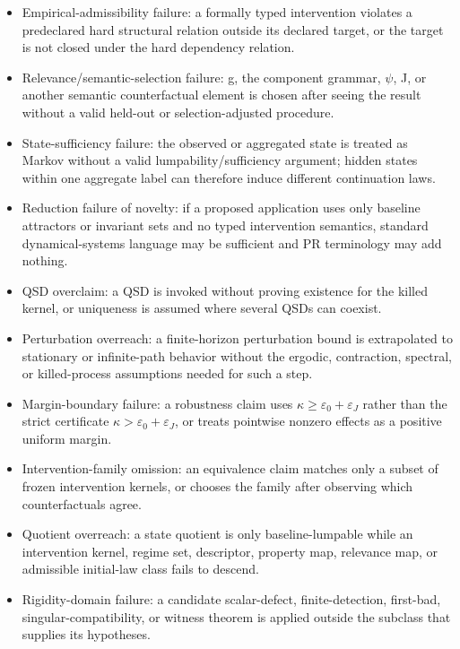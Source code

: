 \documentclass[10pt]{article}
\begin{document}
\begin{itemize}
  unsupported rows or relies on held-fixed causal mechanisms whose
  stability under J lacks adequate identification/provenance.
\item
  Empirical-admissibility failure: a formally typed intervention
  violates a predeclared hard structural relation outside its declared
  target, or the target is not closed under the hard dependency
  relation.
\item
  Relevance/semantic-selection failure: g, the component grammar,
  \(\psi\), J, or another semantic counterfactual element is chosen
  after seeing the result without a valid held-out or selection-adjusted
  procedure.
\item
  State-sufficiency failure: the observed or aggregated state is treated
  as Markov without a valid lumpability/sufficiency argument; hidden
  states within one aggregate label can therefore induce different
  continuation laws.
\item
  Reduction failure of novelty: if a proposed application uses only
  baseline attractors or invariant sets and no typed intervention
  semantics, standard dynamical-systems language may be sufficient and
  PR terminology may add nothing.

\item
  QSD overclaim: a QSD is invoked without proving existence for the killed kernel, or uniqueness is assumed where several QSDs can coexist.
\item
  Perturbation overreach: a finite-horizon perturbation bound is extrapolated to stationary or infinite-path behavior without the ergodic, contraction, spectral, or killed-process assumptions needed for such a step.
\item
  Margin-boundary failure: a robustness claim uses \(\kappa\ge\varepsilon_0+\varepsilon_J\) rather than the strict certificate \(\kappa>\varepsilon_0+\varepsilon_J\), or treats pointwise nonzero effects as a positive uniform margin.
\item
  Intervention-family omission: an equivalence claim matches only a subset of frozen intervention kernels, or chooses the family after observing which counterfactuals agree.
\item
  Quotient overreach: a state quotient is only baseline-lumpable while an intervention kernel, regime set, descriptor, property map, relevance map, or admissible initial-law class fails to descend.
\item
  Rigidity-domain failure: a candidate scalar-defect, finite-detection, first-bad, singular-compatibility, or witness theorem is applied outside the subclass that supplies its hypotheses.
\end{itemize}
\end{document}

